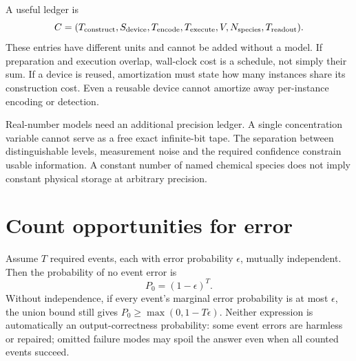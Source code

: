
A useful ledger is
\begin{equation}
 C=(T_{\rm construct},S_{\rm device},T_{\rm encode},
 T_{\rm execute},V,N_{\rm species},T_{\rm readout}).
\end{equation}
These entries have different units and cannot be added without a model.
If preparation and execution overlap, wall-clock cost is a schedule, not
simply their sum. If a device is reused, amortization must state how many
instances share its construction cost. Even a reusable device cannot
amortize away per-instance encoding or detection.

Real-number models need an additional precision ledger. A single concentration
variable cannot serve as a free exact infinite-bit tape. The separation
between distinguishable levels, measurement noise and the required confidence
constrain usable information. A constant number of named chemical species
does not imply constant physical storage at arbitrary precision.

\section{Count opportunities for error}
Assume $T$ required events, each with error probability $\epsilon$, mutually
independent. Then the probability of no event error is
\begin{equation}
 P_0=(1-\epsilon)^T.
\end{equation}
Without independence, if every event's marginal error probability is at most
$\epsilon$, the union bound still gives $P_0\geq\max(0,1-T\epsilon)$.
Neither expression is automatically an output-correctness probability:
some event errors are harmless or repaired; omitted failure modes may spoil
the answer even when all counted events succeed.


